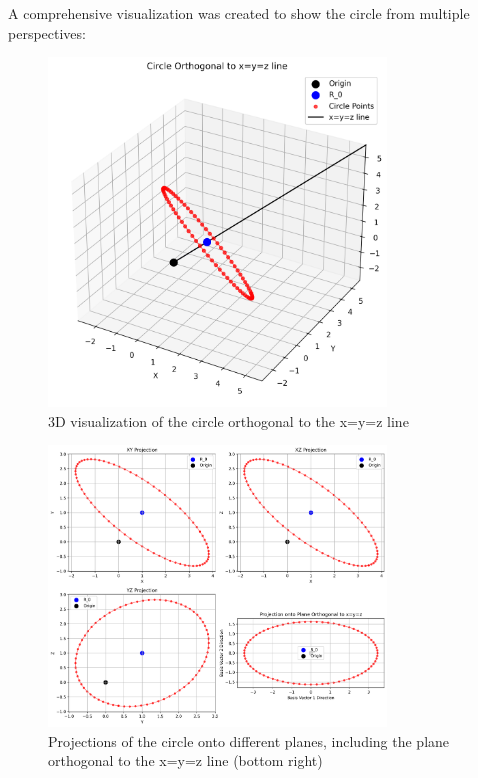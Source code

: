 A comprehensive visualization was created to show the circle from multiple perspectives:

\begin{figure}[H]
    \centering
    \includegraphics[width=0.8\textwidth]{figures/orthogonality_test/orthogonal_circle_3d.png}
    \caption{3D visualization of the circle orthogonal to the x=y=z line}
    \label{fig:orthogonal_circle_3d}
\end{figure}

\begin{figure}[H]
    \centering
    \includegraphics[width=0.8\textwidth]{figures/orthogonality_test/orthogonal_circle_projections.png}
    \caption{Projections of the circle onto different planes, including the plane orthogonal to the x=y=z line (bottom right)}
    \label{fig:orthogonal_circle_projections}
\end{figure}

